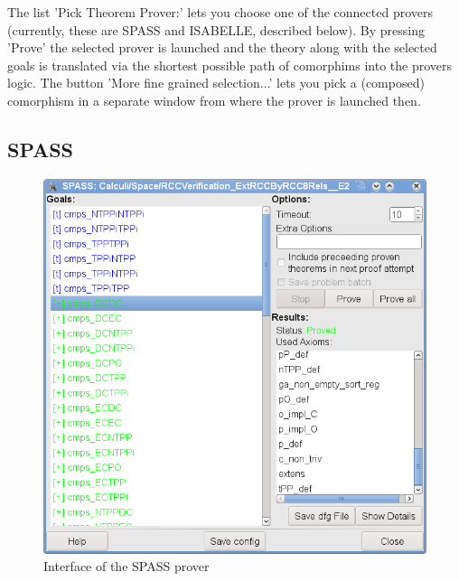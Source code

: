 \documentclass{article}
\newcommand{\normalTEXTSC}[2]{{#1\scriptsize#2}}
\newcommand     {\Isabelle}{\normalTEXTSC{I}{SABELLE}\xspace}
\begin{document}
The list 'Pick Theorem Prover:' lets you choose one of the connected
provers (currently, these are SPASS and \Isabelle, described below). By
pressing 'Prove' the selected prover is launched and the theory along
with the selected goals is translated via the shortest possible path
of comorphims into the provers logic. The button 'More fine grained
selection...' lets you pick a (composed) comorphism in a separate
window from where the prover is launched then.



\subsection*{SPASS}

\begin{figure}
\centering
\includegraphics[width=\textwidth]{spassGUI1}
\caption{Interface of the SPASS prover\label{fig:SPASS_GUI}}
\end{figure}
\end{document}
